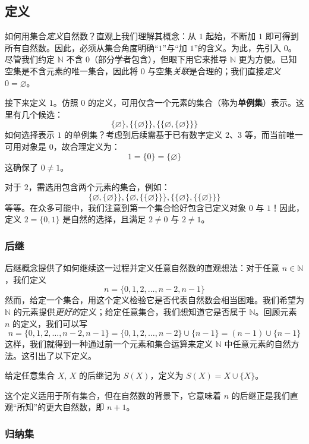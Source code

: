 \subsection{定义}

如何用集合\emph{定义}自然数？直观上我们理解其概念：从 $1$ 起始，不断加 $1$ 即可得到所有自然数。因此，必须从集合角度明确``$1$''与``加 $1$''的含义。为此，先引入 $0$。尽管我们约定 $\mathbb{N}$ 不含 $0$（部分学者包含），但眼下用它来推导 $\mathbb{N}$ 更为方便。已知空集是不含元素的唯一集合，因此将 $0$ 与空集\emph{关联}是合理的；我们直接\emph{定义} $0 = \varnothing$。

接下来定义 $1$。仿照 $0$ 的定义，可用仅含一个元素的集合（称为\textbf{单例集}）表示。这里有几个候选：
\[\{\varnothing\}, \{\{\varnothing\}\} , \{\{\varnothing, \{\varnothing\}\}\}\]
如何选择表示 $1$ 的单例集？考虑到后续需基于已有数字定义 $2$、$3$ 等，而当前唯一可用对象是 $0$，故合理定义为：
\[1 = \{0\} = \{\varnothing\}\]
这确保了 $0 \ne 1$。

对于 $2$，需选用包含两个元素的集合，例如：
\[\{\varnothing, \{\varnothing\}\}, \{\varnothing, \{\{\varnothing\}\}\}, \{\{\varnothing\}, \{\{\varnothing\}\}\}\]
等等。在众多可能中，我们注意到第一个集合恰好包含已定义对象 $0$ 与 $1$！因此，定义 $2 = \{0, 1\}$ 是自然的选择，且满足 $2 \ne 0$ 与 $2 \ne 1$。

\subsubsection*{后继}

后继概念提供了如何继续这一过程并定义任意自然数的直观想法：对于任意 $n \in \mathbb{N}$，我们定义
\[n = \{0, 1, 2, \dots , n - 2, n - 1\}\]
然而，给定一个集合，用这个定义检验它是否代表自然数会相当困难。我们希望为 $\mathbb{N}$ 的元素提供\emph{更好的}定义；给定任意集合，我们想知道它是否属于 $\mathbb{N}$。回顾元素 $n$ 的定义，我们可以写
\[n = \{0, 1, 2, \dots , n - 2, n - 1\} = \{0, 1, 2, \dots , n - 2\} \cup \{n-1\} = (n-1) \cup \{n-1\}\]
这样，我们就得到一种通过前一个元素和集合运算来定义 $\mathbb{N}$ 中任意元素的自然方法。这引出了以下定义。

\begin{definition}
    给定任意集合 $X$, $X$ 的后继记为 $S(X)$，定义为 $S(X) = X \cup \{X\}$。
\end{definition}

这个定义适用于所有集合，但在自然数的背景下，它意味着 $n$ 的后继正是我们直观``所知''的更大自然数，即 $n + 1$。

\subsubsection*{归纳集}

